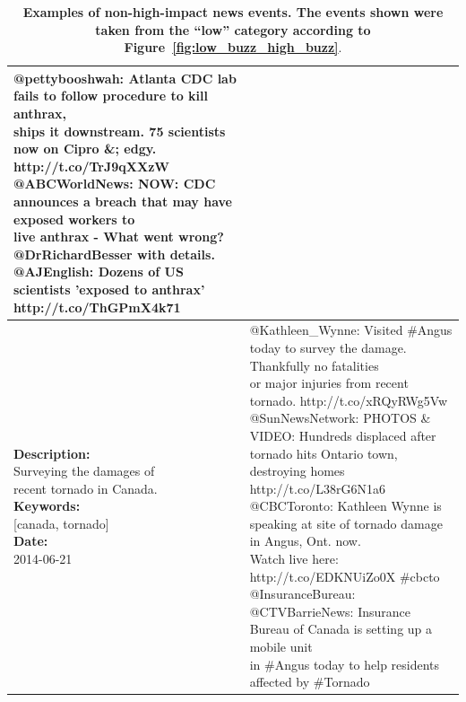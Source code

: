 \documentclass[10pt,letterpaper]{article}
\begin{document}
\begin{table}
{\begin{tabular*}{1\linewidth}{p{5cm}p{5cm}}
{        @pettybooshwah: Atlanta CDC lab fails to follow procedure to kill anthrax,\\ ships it downstream. 75 scientists now on Cipro \&; edgy. http://t.co/TrJ9qXXzW\vspace{.1cm}\\
        @ABCWorldNews: NOW: CDC announces a breach that may have exposed workers to\\ live anthrax - What went wrong? @DrRichardBesser with details.\vspace{.1cm}\\
        @AJEnglish: Dozens of US scientists 'exposed to anthrax' http://t.co/ThGPmX4k71
      }
      \\
      \hline
      \pbox{20cm}{\textbf{Description:}\\Surveying the damages of \\ recent tornado in Canada. \vspace{.1cm}\\
        \textbf{Keywords:}\\ {[}canada, tornado{]}\vspace{.1cm}\\
        \textbf{Date:}\\ 2014-06-21}
      & \pbox{20cm}{
        @Kathleen\_Wynne: Visited \#Angus today to survey the damage. Thankfully no fatalities\\ or major injuries from recent tornado. http://t.co/xRQyRWg5Vw\vspace{.1cm}\\
        @SunNewsNetwork: PHOTOS \& VIDEO: Hundreds displaced after tornado hits Ontario town,\\ destroying homes http://t.co/L38rG6N1a6\vspace{.1cm}\\
        @CBCToronto: Kathleen Wynne is speaking at site of tornado damage in Angus, Ont. now.\\ Watch live here: http://t.co/EDKNUiZo0X \#cbcto\vspace{.1cm}\\
        @InsuranceBureau: @CTVBarrieNews: Insurance Bureau of Canada is setting up a mobile unit\\ in \#Angus today to help residents affected by \#Tornado}
      \\
      \hline
    \end{tabular*}
  }
  \caption{\textbf{Examples of non-high-impact news events. The events
      shown were taken from the ``low'' category according to Figure~\ref{fig:low_buzz_high_buzz}}.}
  \label{table:low-impact-sample}
\end{table}
%
\end{document}
